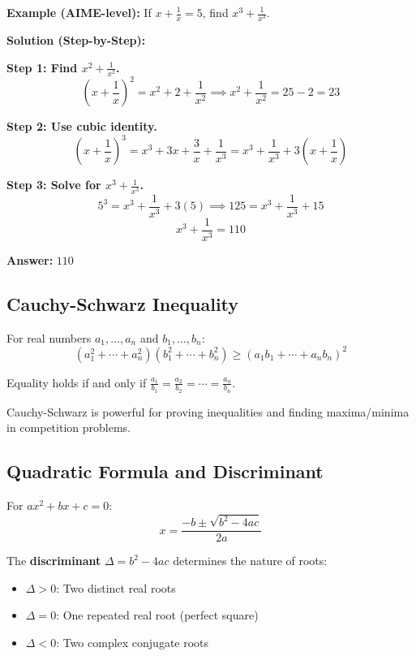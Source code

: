 \documentclass[12pt]{extarticle}
\begin{document}
\begin{examplebox}
\textbf{Example (AIME-level):} If $x + \frac{1}{x} = 5$, find $x^3 + \frac{1}{x^3}$.

\textbf{Solution (Step-by-Step):}

\textbf{Step 1: Find $x^2 + \frac{1}{x^2}$.}
\[
\left(x + \frac{1}{x}\right)^2 = x^2 + 2 + \frac{1}{x^2} \implies x^2 + \frac{1}{x^2} = 25 - 2 = 23
\]

\textbf{Step 2: Use cubic identity.}
\[
\left(x + \frac{1}{x}\right)^3 = x^3 + 3x + \frac{3}{x} + \frac{1}{x^3} = x^3 + \frac{1}{x^3} + 3\left(x + \frac{1}{x}\right)
\]

\textbf{Step 3: Solve for $x^3 + \frac{1}{x^3}$.}
\[
5^3 = x^3 + \frac{1}{x^3} + 3(5) \implies 125 = x^3 + \frac{1}{x^3} + 15
\]
\[
x^3 + \frac{1}{x^3} = 110
\]

\textbf{Answer:} $\boxed{110}$
\end{examplebox}

\subsection{Cauchy-Schwarz Inequality}

For real numbers $a_1, \ldots, a_n$ and $b_1, \ldots, b_n$:
\[
(a_1^2 + \cdots + a_n^2)(b_1^2 + \cdots + b_n^2) \ge (a_1b_1 + \cdots + a_nb_n)^2
\]

Equality holds if and only if $\frac{a_1}{b_1} = \frac{a_2}{b_2} = \cdots = \frac{a_n}{b_n}$.

\begin{remarkbox}
Cauchy-Schwarz is powerful for proving inequalities and finding maxima/minima in competition problems.
\end{remarkbox}

\subsection{Quadratic Formula and Discriminant}

For $ax^2 + bx + c = 0$:
\[
x = \frac{-b \pm \sqrt{b^2-4ac}}{2a}
\]

The \textbf{discriminant} $\Delta = b^2 - 4ac$ determines the nature of roots:
\begin{itemize}
    \item $\Delta > 0$: Two distinct real roots
    \item $\Delta = 0$: One repeated real root (perfect square)
    \item $\Delta < 0$: Two complex conjugate roots
\end{itemize}
\end{document}
